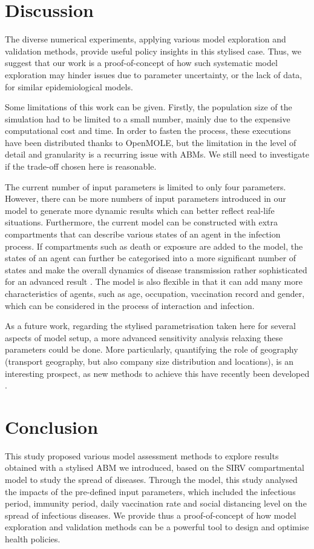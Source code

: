 \documentclass[smallextended]{svjour3}       %
\begin{document}
\section{Discussion}

The diverse numerical experiments, applying various model exploration and validation methods, provide useful policy insights in this stylised case. Thus, we suggest that our work is a proof-of-concept of how such systematic model exploration may hinder issues due to parameter uncertainty, or the lack of data, for similar epidemiological models.

Some limitations of this work can be given. Firstly, the population size of the simulation had to be limited to a small number, mainly due to the expensive computational cost and time. In order to fasten the process, these executions have been distributed thanks to OpenMOLE, but the limitation in the level of detail and granularity is a recurring issue with ABMs. We still need to investigate if the trade-off chosen here is reasonable.

The current number of input parameters is limited to only four parameters. However, there can be more numbers of input parameters introduced in our model to generate more dynamic results which can better reflect real-life situations. Furthermore, the current model can be constructed with extra compartments that can describe various states of an agent in the infection process. If compartments such as death or exposure are added to the model, the states of an agent can further be categorised into a more significant number of states and make the overall dynamics of disease transmission rather sophisticated for an advanced result \cite{reyne2022principles}. The model is also flexible in that it can add many more characteristics of agents, such as age, occupation, vaccination record and gender, which can be considered in the process of interaction and infection.

As a future work, regarding the stylised parametrisation taken here for several aspects of model setup, a more advanced sensitivity analysis relaxing these parameters could be done. More particularly, quantifying the role of geography (transport geography, but also company size distribution and locations), is an interesting prospect, as new methods to achieve this have recently been developed \cite{raimbault2019space}.


\section{Conclusion}

This study proposed various model assessment methods to explore results obtained with a stylised ABM we introduced, based on the SIRV compartmental model to study the spread of diseases. Through the model, this study analysed the impacts of the pre-defined input parameters, which included the infectious period, immunity period, daily vaccination rate and social distancing level on the spread of infectious diseases. We provide thus a proof-of-concept of how model exploration and validation methods can be a powerful tool to design and optimise health policies.





\end{document}
